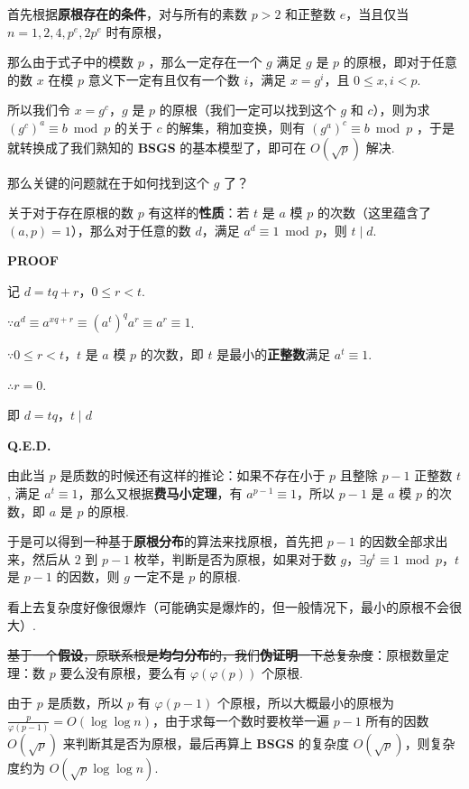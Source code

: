 首先根据\textbf{原根存在的条件}，对与所有的素数 $p>2$ 和正整数 $e$，当且仅当 $n=1,2,4,p^e,2p^e$ 时有原根，

那么由于式子中的模数 $p$ ，那么一定存在一个 $g$ 满足 $g$ 是 $p$ 的原根，即对于任意的数 $x$ 在模 $p$ 意义下一定有且仅有一个数 $i$，满足 $x = g^i$，且 $0 \le x,i < p$.

所以我们令 $x=g^c$，$g$ 是 $p$ 的原根（我们一定可以找到这个 $g$ 和 $c$），则为求 $(g^c)^a \equiv b \bmod p$ 的关于 $c$ 的解集，稍加变换，则有 $(g^a)^c \equiv b \bmod p$ ，于是就转换成了我们熟知的 \textbf{BSGS} 的基本模型了，即可在 $O(\sqrt p)$ 解决.

那么关键的问题就在于如何找到这个 $g$ 了？

关于对于存在原根的数 $p$ 有这样的\textbf{性质}：若 $t$ 是 $a$ 模 $p$ 的次数（这里蕴含了 $(a,p)=1$），那么对于任意的数 $d$，满足 $a^d \equiv 1 \bmod p$，则 $t \mid d$.

\textbf{PROOF}

记 $d = tq+r$，$0 \le r < t$.

$\because a^d \equiv a^{xq+r} \equiv (a^t)^qa^r \equiv a^r \equiv 1$.

$\because 0 \le r < t$，$t$ 是 $a$ 模 $p$ 的次数，即 $t$ 是最小的\textbf{正整数}满足 $a^t \equiv 1$.

$\therefore r = 0$.

即 $d = tq$，$t \mid d$

\textbf{Q.E.D.}

由此当 $p$ 是质数的时候还有这样的推论：如果不存在小于 $p$ 且整除 $p-1$ 正整数 $t$, 满足 $a^t \equiv 1$，那么又根据\textbf{费马小定理}，有 $a^{p-1} \equiv 1$，所以 $p-1$ 是 $a$ 模 $p$ 的次数，即 $a$ 是 $p$ 的原根.

于是可以得到一种基于\textbf{原根分布}的算法来找原根，首先把 $p-1$ 的因数全部求出来，然后从 $2$ 到 $p-1$ 枚举，判断是否为原根，如果对于数 $g$，$\exists g^t \equiv 1 \bmod p$，$t$ 是 $p-1$ 的因数，则 $g$ 一定不是 $p$ 的原根.

看上去复杂度好像很爆炸（可能确实是爆炸的，但一般情况下，最小的原根不会很大）.

\st{基于一个\textbf{假设}，原联系根是\textbf{均匀分布}的，我们\textbf{伪证明}一下总复杂度}：原根数量定理：数 $p$ 要么没有原根，要么有 $\varphi(\varphi(p))$ 个原根.

由于 $p$ 是质数，所以 $p$ 有 $\varphi(p-1)$ 个原根，所以大概最小的原根为 $\frac{p}{\varphi(p-1)}=O(\log\log n)$，由于求每一个数时要枚举一遍 $p-1$ 所有的因数 $O(\sqrt p)$ 来判断其是否为原根，最后再算上 \textbf{BSGS} 的复杂度 $O(\sqrt{p})$，则复杂度约为 $O(\sqrt{p}\log \log n)$.

